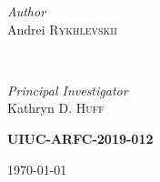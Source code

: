 \documentclass[12pt]{article} %
\begin{document}
\begin{titlepage}
\begin{minipage}{0.6\textwidth}
        \end{minipage}

    \vspace{0.2cm}
    \HRule
    \vspace{0.5cm}
    
    
    \begin{minipage}{0.4\textwidth}
        \begin{flushleft}
            \large
            \textit{Author}\\
            Andrei \textsc{Rykhlevskii}\\
        \end{flushleft}
    \end{minipage}
    ~
    \begin{minipage}{0.4\textwidth}
        \begin{flushright}
            \large
            \textit{Principal Investigator}\\
            Kathryn D. \textsc{Huff} %
        \end{flushright}
    \end{minipage}
    

    \vspace{1cm}
    \textsc{\LARGE\bfseries UIUC-ARFC-2019-012} %
    \vspace{0.5cm}
    
    
    \vspace{0.5cm} %
    {\large\today} %
    \vspace{0.5cm}

    

\end{titlepage}
\end{document}
